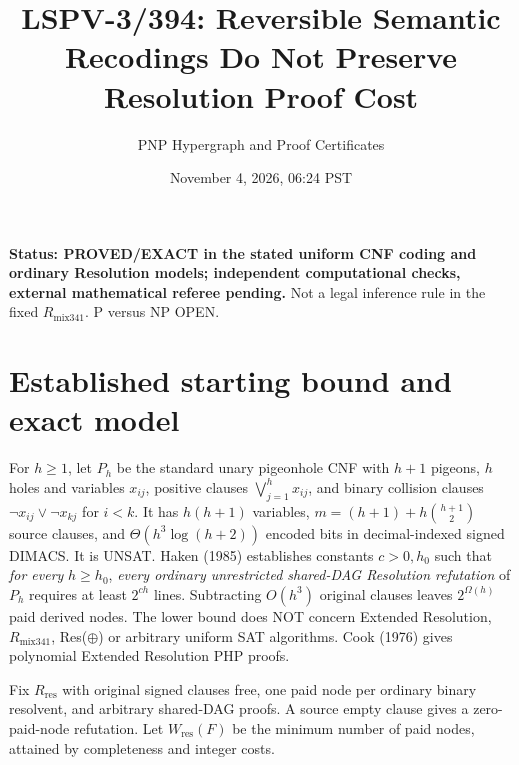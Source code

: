 \documentclass[11pt]{article}
\title{LSPV-3/394: Reversible Semantic Recodings Do Not Preserve Resolution Proof Cost}
\author{PNP Hypergraph and Proof Certificates}
\date{November 4, 2026, 06:24 PST}
\begin{document}
\maketitle
\noindent\textbf{Status: PROVED/EXACT in the stated uniform CNF coding and ordinary Resolution models; independent computational checks, external mathematical referee pending.} Not a legal inference rule in the fixed \(R_{\mathrm{mix341}}\). P versus NP OPEN.

\section*{Established starting bound and exact model}
For \(h\ge1\), let \(P_h\) be the standard unary pigeonhole CNF with \(h+1\) pigeons, \(h\) holes and variables \(x_{ij}\), positive clauses \(\bigvee_{j=1}^h x_{ij}\), and binary collision clauses \(\neg x_{ij}\vee\neg x_{kj}\) for \(i<k\). It has \(h(h+1)\) variables, \(m=(h+1)+h\binom{h+1}{2}\) source clauses, and \(\Theta(h^3\log(h+2))\) encoded bits in decimal-indexed signed DIMACS. It is UNSAT. Haken (1985) establishes constants \(c>0,h_0\) such that \emph{for every} \(h\ge h_0\), \emph{every ordinary unrestricted shared-DAG Resolution refutation} of \(P_h\) requires at least \(2^{ch}\) lines. Subtracting \(O(h^3)\) original clauses leaves \(2^{\Omega(h)}\) paid derived nodes. The lower bound does NOT concern Extended Resolution, \(R_{\mathrm{mix341}}\), Res(\(\oplus\)) or arbitrary uniform SAT algorithms. Cook (1976) gives polynomial Extended Resolution PHP proofs.

Fix \(R_{\mathrm{res}}\) with original signed clauses free, one paid node per ordinary binary resolvent, and arbitrary shared-DAG proofs. A source empty clause gives a zero-paid-node refutation. Let \(W_{\mathrm{res}}(F)\) be the minimum number of paid nodes, attained by completeness and integer costs.
\end{document}
